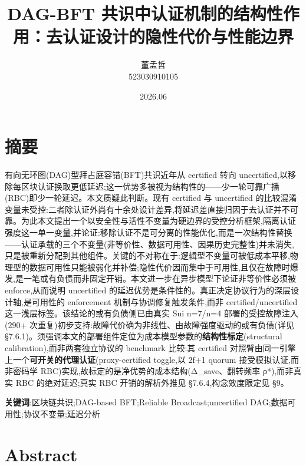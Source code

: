 \documentclass[UTF8,fontset=windows,a4paper,11pt]{ctexart}
\title{DAG-BFT
共识中认证机制的结构性作用：去认证设计的隐性代价与性能边界}
\author{董孟哲\\523030910105}
\date{2026.06}
\begin{document}
\maketitle
\tableofcontents
\bigskip

\section{摘要}\label{ux6458ux8981}

有向无环图(DAG)型拜占庭容错(BFT)共识近年从 certified 转向
uncertified,以移除每区块认证换取更低延迟;这一优势多被视为结构性的------少一轮可靠广播(RBC)即少一轮延迟。本文质疑此判断。现有
certified 与 uncertified
的比较混淆变量未受控:二者除认证外尚有十余处设计差异,将延迟差直接归因于去认证并不可靠。为此本文提出一个以安全性与活性不变量为硬边界的受控分析框架,隔离认证强度这一单一变量,并论证:移除认证不是可分离的性能优化,而是一次结构性替换------认证承载的三个不变量(非等价性、数据可用性、因果历史完整性)并未消失,只是被重新分配到其他组件。关键的不对称在于:逻辑型不变量可被低成本平移,物理型的数据可用性只能被弱化并补偿;隐性代价因而集中于可用性,且仅在故障时爆发,是一笔或有负债而非固定开销。本文进一步在异步模型下论证非等价性必须被
enforce,从而说明 uncertified
的延迟优势是条件性的。真正决定协议行为的深层设计轴,是可用性的
enforcement 机制与协调修复触发条件,而非 certified/uncertified
这一浅层标签。该结论的或有负债侧已由真实 Sui n=7/n=4
部署的受控故障注入(290+
次重复)初步支持:故障代价确为非线性、由故障强度驱动的或有负债(详见
§7.6.1)。须强调本文的部署组件定位为成本模型参数的\textbf{结构性标定}(structural
calibration),而非两套独立协议的 benchmark
比较:其 certified 对照臂由同一引擎上一个\textbf{可开关的代理认证}(proxy-certified
toggle,以 2f+1 quorum 接受模拟认证,而非密码学 RBC)实现,故标定的是净优势的成本结构(Δ\_save、翻转频率 ρ*),而非真实 RBC 的绝对延迟;真实 RBC
开销的解析外推见 §7.6.4,构念效度限定见 §9。

\textbf{关键词}:区块链共识;DAG-based BFT;Reliable Broadcast;uncertified
DAG;数据可用性;协议不变量;延迟分析

\section{Abstract}\label{abstract}
\end{document}
